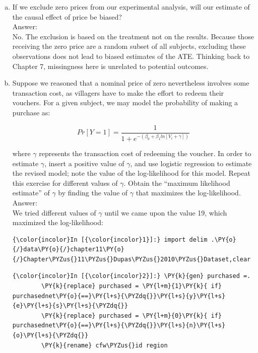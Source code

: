 \documentclass[11pt,notitlepage]{article}\usepackage[]{graphicx}\usepackage[]{color}
\makeatletter
\newenvironment{kframe}{%
 \def\at@end@of@kframe{}%
 \ifinner\ifhmode%
  \def\at@end@of@kframe{\end{minipage}}%
  \begin{minipage}{\columnwidth}%
 \fi\fi%
 \def\FrameCommand##1{\hskip\@totalleftmargin \hskip-\fboxsep
 \colorbox{shadecolor}{##1}\hskip-\fboxsep
     \hskip-\linewidth \hskip-\@totalleftmargin \hskip\columnwidth}%
 \MakeFramed {\advance\hsize-\width
   \@totalleftmargin\z@ \linewidth\hsize
   \@setminipage}}%
 {\par\unskip\endMakeFramed%
 \at@end@of@kframe}
\newenvironment{knitrout}{}{} %
\makeatother
\begin{document}
\begin{enumerate}[a)]
\item If we exclude zero prices from our experimental analysis, will our estimate of the causal effect of price be biased?\\
Answer:\\
No. The exclusion is based on the treatment not on the results. Because those receiving the zero price are a random subset of all subjects, excluding these observations does not lead to biased estimates of the ATE. Thinking back to Chapter 7, missingness here is unrelated to potential outcomes.

\item Suppose we reasoned that a nominal price of zero nevertheless involves some transaction cost, as villagers have to make the effort to redeem their vouchers. For a given subject, we may model the probability of making a purchase as:

\begin{equation*}
Pr[Y=1] = \frac{1}{1 + e^{-(\beta_0+\beta_1 ln[V_i+\gamma])}}
\end{equation*}

where $\gamma$ represents the transaction cost of redeeming the voucher. In order to estimate $\gamma$, insert a positive value of $\gamma$, and use logistic regression to estimate the revised model; note the value of the log-likelihood for this model. Repeat this exercise for different values of $\gamma$. Obtain the ``maximum likelihood estimate'' of $\gamma$ by finding the value of $\gamma$ that maximizes the log-likelihood. \\
Answer:\\
We tried different values of $\gamma$ until we came upon the value 19, which maximized the log-likelihood:
\begin{knitrout}
\color{fgcolor}\begin{kframe}
    \begin{Verbatim}[commandchars=\\\{\}]
{\color{incolor}In [{\color{incolor}1}]:} import delim .\PY{o}{/}data\PY{o}{/}chapter11\PY{o}{/}Chapter\PYZus{}11\PYZus{}Dupas\PYZus{}2010\PYZus{}Dataset,clear
\end{Verbatim}

    \begin{Verbatim}[commandchars=\\\{\}]
{\color{incolor}In [{\color{incolor}2}]:} \PY{k}{gen} purchased =.
        \PY{k}{replace} purchased = \PY{l+m}{1}\PY{k}{ if} purchasednet\PY{o}{==}\PY{l+s}{\PYZdq{}}\PY{l+s}{y}\PY{l+s}{e}\PY{l+s}{s}\PY{l+s}{\PYZdq{}}
        \PY{k}{replace} purchased = \PY{l+m}{0}\PY{k}{ if} purchasednet\PY{o}{==}\PY{l+s}{\PYZdq{}}\PY{l+s}{n}\PY{l+s}{o}\PY{l+s}{\PYZdq{}}    
        \PY{k}{rename} cfw\PYZus{}id region		
            

\end{Verbatim}
\end{kframe}
\end{knitrout}
\end{enumerate}
\end{document}
